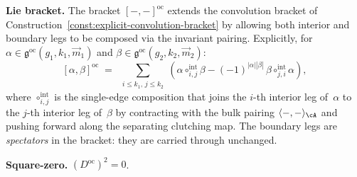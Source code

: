 \begin{theorem}
\noindent\textbf{Lie bracket.}
The bracket $[-,-]^{\mathrm{oc}}$ extends the convolution bracket of
Construction~\textup{\ref{const:explicit-convolution-bracket}} by
allowing both interior and boundary legs to be composed via the
invariant pairing.  Explicitly, for
$\alpha \in \mathfrak{g}^{\mathrm{oc}}(g_1, k_1, \vec{m}_1)$ and
$\beta \in \mathfrak{g}^{\mathrm{oc}}(g_2, k_2, \vec{m}_2)$:
\begin{equation}\label{eq:oc-bracket}
[\alpha, \beta]^{\mathrm{oc}}
\;=\;
\sum_{\substack{i \leq k_1,\, j \leq k_2}}
(\alpha \circ_{i,j}^{\mathrm{int}} \beta
- (-1)^{|\alpha||\beta|}\,
\beta \circ_{j,i}^{\mathrm{int}} \alpha),
\end{equation}
where $\circ_{i,j}^{\mathrm{int}}$ is the single-edge composition
that joins the $i$-th interior leg of~$\alpha$ to the $j$-th
interior leg of~$\beta$ by contracting with the bulk pairing
$\langle -, - \rangle_\cA$ and pushing forward along the
separating clutching map.  The boundary legs are
\emph{spectators} in the bracket: they are carried through
unchanged.

\noindent\textbf{Square-zero.}
$(D^{\mathrm{oc}})^2 = 0$.
\end{theorem}

